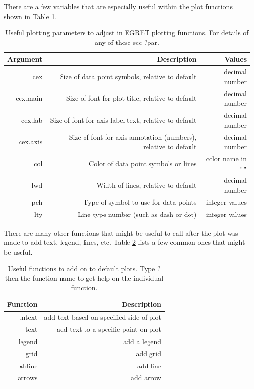 \documentclass[a4paper,11pt]{article}\usepackage{graphicx, color}
\begin{document}
There are a few variables that are especially useful within the plot functions shown in Table \ref{table:tableChangeSingle}.

\begin{table}[ht]
\centering
\begin{tabular}{rrr}
  \hline
Argument & Description & Values  \\ 
  \hline
cex &  Size of data point symbols, relative to default & decimal number \\ 
cex.main & Size of font for plot title, relative to default & decimal number \\ 
cex.lab &  Size of font for axis label text, relative to default & decimal number \\ 
cex.axis & Size of font for axis annotation (numbers), relative to default & decimal number\\
col & Color of data point symbols or lines & color name in \texttt{"}\texttt{"} \\
lwd & Width of lines, relative to default & decimal number\\
pch & Type of symbol to use for data points & integer values\\
lty & Line type number (such as dash or dot) & integer values\\
   \hline
\end{tabular}
\caption{Useful plotting parameters to adjust in EGRET plotting functions.  For details of any of these see ?par.} 
\label{table:tableChangeSingle}
\end{table}

There are many other functions that might be useful to call after the plot was made to add text, legend, lines, etc. Table \ref{table:addOns} lists a few common ones that might be useful.

\begin{table}[ht]
\centering
\begin{tabular}{rr}
  \hline
Function & Description  \\ 
  \hline
mtext & add text based on specified side of plot\\
text & add text to a specific point on plot\\
legend & add a legend \\ 
grid & add grid\\ 
abline & add line \\
arrows & add arrow \\ 
   \hline
\end{tabular}
\caption{Useful functions to add on to default plots. Type ? then the function name to get help on the individual function.} 
\label{table:addOns}
\end{table}
\end{document}
